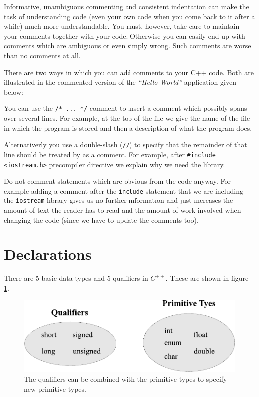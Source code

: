 Informative, unambiguous commenting and consistent indentation can make the task of
understanding code (even your own code when you come back to it after a while)
much more understandable. You must, however, take care to maintain your comments
together with your code. Otherwise you can easily end up with comments which are
ambiguous or even simply wrong. Such comments are worse than no comments at all.

There are two ways in which you can add comments to your C++ code. Both are
illustrated in the commented version of the {\it``Hello World''} application given
below:

\noindent {\small }

\noindent
You can use the \verb+/* ... */+ comment to insert a comment which possibly spans
over several lines. For example, at the top of the file we give  the name of the
file in which the program is stored and then a description of what the program does.

Alternativerly you use a double-slash (\verb+//+) to specify that the remainder of that
line should be treated by as a comment. For example, after \verb+#include <iostream.h>+
precompiler directive we explain why we need the library.

Do not comment statements which are obvious from the code anyway. For example
adding a comment after the \verb+include+ statement that we are including the
\verb+iostream+ library gives us no further information and just increases the
amount of text the reader has to read and the amount of work involved when
changing the code (since we have to update the comments too).


\section{Declarations}

There are 5 basic data types and 5 qualifiers
in $C^{++}$. These are shown in figure \ref{figPrimitives}.

  \begin{figure}[htb]
    \begin{center}  
      \includegraphics{BasicCPP/Figures/Primitives.pdf}
    \end{center}  
    \caption{The qualifiers can be combined with the primitive types to 
             specify new primitive types.
             \label{figPrimitives}} 
  \end{figure}

